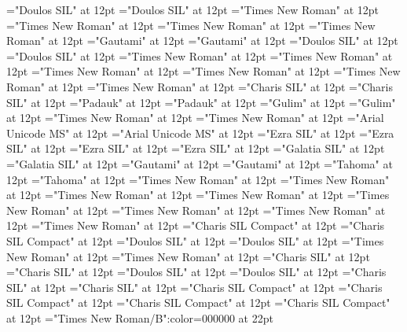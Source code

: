 \documentclass[a4paper]{article}
\begin{document}
\font\spantrfonipa="Doulos SIL" at 12pt
\font\divtrfonipa="Doulos SIL" at 12pt
\font\spantrfonipaxemic="Times New Roman" at 12pt
\font\divtrfonipaxemic="Times New Roman" at 12pt
\font\spantpi="Times New Roman" at 12pt
\font\divtpi="Times New Roman" at 12pt
\font\spante="Gautami" at 12pt
\font\divte="Gautami" at 12pt
\font\spanseh="Doulos SIL" at 12pt
\font\divseh="Doulos SIL" at 12pt
\font\spanru="Times New Roman" at 12pt
\font\divru="Times New Roman" at 12pt
\font\spanqaaxcam="Times New Roman" at 12pt
\font\divqaaxcam="Times New Roman" at 12pt
\font\spanpt="Times New Roman" at 12pt
\font\divpt="Times New Roman" at 12pt
\font\spannko="Charis SIL" at 12pt
\font\divnko="Charis SIL" at 12pt
\font\spanmy="Padauk" at 12pt
\font\divmy="Padauk" at 12pt
\font\spanko="Gulim" at 12pt
\font\divko="Gulim" at 12pt
\font\spanid="Times New Roman" at 12pt
\font\divid="Times New Roman" at 12pt
\font\spanhi="Arial Unicode MS" at 12pt
\font\divhi="Arial Unicode MS" at 12pt
\font\spanhe="Ezra SIL" at 12pt
\font\divhe="Ezra SIL" at 12pt
\font\spanhbo="Ezra SIL" at 12pt
\font\divhbo="Ezra SIL" at 12pt
\font\spangrc="Galatia SIL" at 12pt
\font\divgrc="Galatia SIL" at 12pt
\font\spanggoTeluIN="Gautami" at 12pt
\font\divggoTeluIN="Gautami" at 12pt
\font\spanggofonipaxemic="Tahoma" at 12pt
\font\divggofonipaxemic="Tahoma" at 12pt
\font\spanfr="Times New Roman" at 12pt
\font\divfr="Times New Roman" at 12pt
\font\spanfa="Times New Roman" at 12pt
\font\divfa="Times New Roman" at 12pt
\font\spanes="Times New Roman" at 12pt
\font\dives="Times New Roman" at 12pt
\font\spanen="Times New Roman" at 12pt
\font\diven="Times New Roman" at 12pt
\font\spanenQaaaxtest="Charis SIL Compact" at 12pt
\font\divenQaaaxtest="Charis SIL Compact" at 12pt
\font\spanenfonipa="Doulos SIL" at 12pt
\font\divenfonipa="Doulos SIL" at 12pt
\font\spande="Times New Roman" at 12pt
\font\divde="Times New Roman" at 12pt
\font\spanbzh="Charis SIL" at 12pt
\font\divbzh="Charis SIL" at 12pt
\font\spanbzhfonipa="Doulos SIL" at 12pt
\font\divbzhfonipa="Doulos SIL" at 12pt
\font\spanbss="Charis SIL" at 12pt
\font\divbss="Charis SIL" at 12pt
\font\spanbssxako="Charis SIL Compact" at 12pt
\font\divbssxako="Charis SIL Compact" at 12pt
\font\spanbssfonipa="Charis SIL Compact" at 12pt
\font\divbssfonipa="Charis SIL Compact" at 12pt
\color{black} 
\thispagestyle{empty} 
\font\CoverPageHeading="Times New Roman/B":color=000000 at 22pt 
\vskip 60pt 
\begin{center} 
\end{center} 
\newpage 
\newpage 
\thispagestyle{empty} 
\mbox{} 
\end{document}
